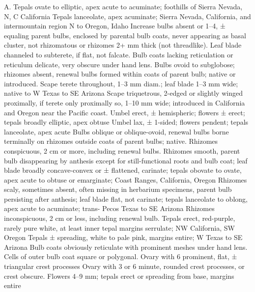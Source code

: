 \documentclass[a4paper]{article}
\begin{document}
\begin{Key}{A. }
\alter Tepals ovate to elliptic, apex acute to acuminate; foot\-hills of Sierra Nevada, N, C California
\alter Tepals lanceolate, apex acuminate; Sierra Nevada, California, and intermountain region N to Oregon, Idaho
\alter Increase bulbs absent or 1--4, ± equaling parent bulbs, enclosed by parental bulb coats, never appearing as basal cluster, not rhizomatous or rhizomes 2+ mm thick (not threadlike).
\alter Leaf blade channeled to subterete, if flat, not falcate.
\alter Bulb coats lacking reticulation or reticulum delicate, very obscure under hand lens.
\alter Bulbs ovoid to subglobose; rhizomes absent, renewal bulbs formed within coats of parent bulb; native or introduced.
\alter Scape terete throughout, 1--3 mm diam.; leaf blade 1--3 mm wide; native to W Texas to SE Arizona
\alter Scape triquetrous, 2-edged or slightly winged proximally, if terete only proximally so, 1--10 mm wide; introduced in California and Oregon near the Pacific coast.
\alter Umbel erect, ± hemispheric; flowers ± erect; tepals broadly elliptic, apex obtuse
\alter Umbel lax, ± 1-sided; flowers pendent; tepals lanceolate, apex acute
\alter Bulbs oblique or oblique-ovoid, renewal bulbs borne terminally on rhizomes outside coats of parent bulbs; native.
\alter Rhizomes conspicuous, 2 cm or more, including renewal bulbs.
\alter Rhizomes smooth, parent bulb disappearing by anthesis except for still-functional roots and bulb coat; leaf blade broadly concave-convex or ± flattened, carinate; tepals obovate to ovate, apex acute to obtuse or emarginate; Coast Ranges, California, Oregon
\alter Rhizomes scaly, sometimes absent, often missing in herbarium specimens, parent bulb persisting after anthesis; leaf blade flat, not carinate; tepals lanceolate to oblong, apex acute to acuminate; trans- Pecos Texas to SE Arizona
\alter Rhizomes inconspicuous, 2 cm or less, including renewal bulb.
\alter Tepals erect, red-purple, rarely pure white, at least inner tepal margins serrulate; NW California, SW Oregon
\alter Tepals ± spreading, white to pale pink, margins entire; W Texas to SE Arizona
\alter Bulb coats obviously reticulate with prominent meshes under hand lens.
\alter Cells of outer bulb coat square or polygonal.
\alter Ovary with 6 prominent, flat, ± triangular crest processes
\alter Ovary with 3 or 6 minute, rounded crest processes, or crest obscure.
\alter Flowers 4--9 mm; tepals erect or spreading from base, margins entire

\end{Key}
\end{document}
